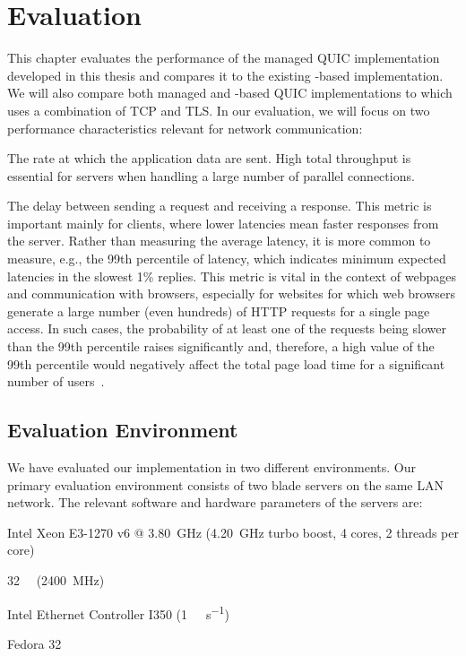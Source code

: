 \chapter{Evaluation}\label{chap:04-evaluation}

This chapter evaluates the performance of the managed QUIC implementation developed in this thesis
and compares it to the existing \libmsquic{}-based implementation. We will also compare both managed
and \libmsquic{}-based QUIC implementations to  which uses a combination of TCP and
TLS\@. In our evaluation, we will focus on two performance characteristics relevant for network
communication:

\begin{itemize}

         The rate at which the application data are sent. High total throughput is
essential for servers when handling a large number of parallel connections.

         The delay between sending a request and receiving a
response. This metric is important mainly for clients, where lower latencies mean faster responses
from the server. Rather than measuring the average latency, it is more common to measure, e.g., the
99th percentile of latency, which indicates minimum expected latencies in the slowest 1\% replies.
This metric is vital in the context of webpages and communication with browsers, especially for
websites for which web browsers generate a large number (even hundreds) of HTTP requests for a
single page access. In such cases, the probability of at least one of the requests being slower than
the 99th percentile raises significantly and, therefore, a high value of the 99th percentile would
negatively affect the total page load time for a significant number of users~\cite{Treat2015}.

\end{itemize}

\section{Evaluation Environment}

We have evaluated our implementation in two different environments. Our primary evaluation
environment consists of two blade servers on the same LAN network. The relevant software and
hardware parameters of the servers are:

\begin{itemize}

         Intel\textsuperscript{\textregistered{}} Xeon\textsuperscript{\textregistered{}}
E3-1270 v6 @ \SI{3.80}{\giga\hertz} (\SI{4.20}{\giga\hertz} turbo boost, 4 cores, 2 threads per
core)

         \SI{32}{\giga\byte} (\SI{2400}{\mega\hertz})

         Intel\textsuperscript{\textregistered{}} Ethernet Controller
I350 (\SI[per-mode=symbol]{1}{\giga\bit\per\second})

         Fedora 32

\end{itemize}

